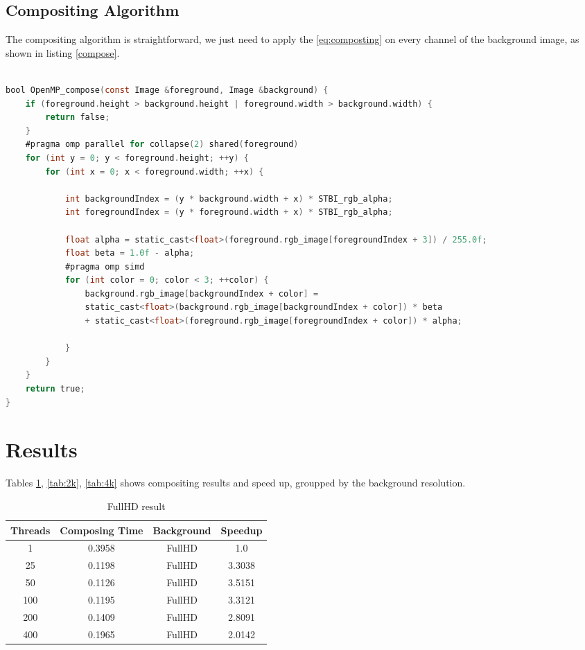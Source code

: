 \documentclass[10pt,twocolumn,letterpaper,english]{article}
\begin{document}
\subsection{Compositing Algorithm}

The compositing algorithm is straightforward, we just need to apply the \ref{eq:composting} on every channel of the background image, as shown in listing \ref{compose}.
\begin{lstlisting}[style=cppstyle, language=C, caption={Snippet of compose funcion},label={compose}]

bool OpenMP_compose(const Image &foreground, Image &background) {
	if (foreground.height > background.height | foreground.width > background.width) {
		return false;
	}
	#pragma omp parallel for collapse(2) shared(foreground)
	for (int y = 0; y < foreground.height; ++y) {
		for (int x = 0; x < foreground.width; ++x) {
			
			int backgroundIndex = (y * background.width + x) * STBI_rgb_alpha;
			int foregroundIndex = (y * foreground.width + x) * STBI_rgb_alpha;
			
			float alpha = static_cast<float>(foreground.rgb_image[foregroundIndex + 3]) / 255.0f;
			float beta = 1.0f - alpha;
			#pragma omp simd
			for (int color = 0; color < 3; ++color) {
				background.rgb_image[backgroundIndex + color] =
				static_cast<float>(background.rgb_image[backgroundIndex + color]) * beta
				+ static_cast<float>(foreground.rgb_image[foregroundIndex + color]) * alpha;
				
			}
		}
	}
	return true;
}

\end{lstlisting}


\section{Results}

Tables  \ref{tab:fullhd}, \ref{tab:2k}, \ref{tab:4k} shows compositing results and speed up, groupped by the background resolution.

\begin{table}[h]
	\centering
	\caption{FullHD result}
	\begin{tabular}{|c|c|c|c|}
		\hline
		\textbf{Threads} & \textbf{Composing Time} & \textbf{Background} & \textbf{Speedup} \\
		\hline
		1   & 0.3958 & FullHD & 1.0 \\
		25  & 0.1198 & FullHD & 3.3038 \\
		50  & 0.1126 & FullHD & 3.5151 \\
		100 & 0.1195 & FullHD & 3.3121 \\
		200 & 0.1409 & FullHD & 2.8091 \\
		400 & 0.1965 & FullHD & 2.0142 \\
		\hline
	\end{tabular}
	\label{tab:fullhd}
\end{table}
\end{document}
